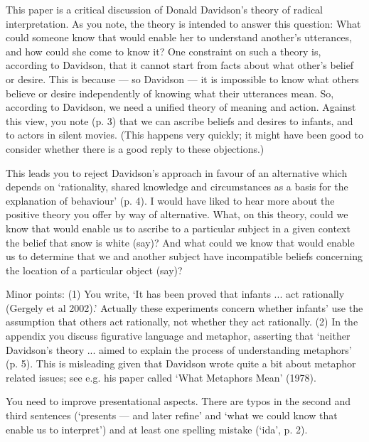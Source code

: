 \documentclass[12pt,a4paper]{extarticle}
\begin{document}
\setlength\footnotesep{1em}


\author{}
\date{}


\maketitle





This paper is a critical discussion of Donald Davidson's theory of radical interpretation.  As you note, the theory is intended to answer this question: What could someone know that would enable her to understand another's utterances, and how could she come to know it?  One constraint on such a theory is, according to Davidson, that it cannot start from facts about what other's belief or desire.  This is because --- so Davidson --- it is impossible to know what others believe or desire independently of knowing what their utterances mean.  So, according to Davidson, we need a unified theory of meaning and action.  Against this view, you note (p. 3) that we can ascribe beliefs and desires to infants, and to actors in silent movies.  (This happens very quickly; it might have been good to consider whether there is a good reply to these objections.)   

This leads you to reject Davidson's approach in favour of an alternative which depends on `rationality, shared knowledge and circumstances as a basis for the explanation of behaviour' (p. 4).  I would have liked to hear more about the positive theory you offer by way of alternative.  What, on this theory, could we know that would enable us to ascribe to a particular subject in a given context the belief that snow is white (say)?  And what could we know that would enable us to determine that we and another subject have incompatible beliefs concerning the location of a particular object (say)?

Minor points: (1) You write, `It has been proved that infants ... act rationally (Gergely et al 2002).'  Actually these experiments concern whether infants' use the assumption that others act rationally, not whether they act rationally.  (2) In the appendix you discuss figurative language and metaphor, asserting that `neither Davidson's theory ... aimed to explain the process of understanding metaphors' (p. 5).  This is misleading given that Davidson wrote quite a bit about metaphor related issues; see e.g. his paper called `What Metaphors Mean' (1978).

You need to improve presentational aspects.  There are typos in the second and third sentences (`presents --- and later refine' and `what we could know that enable us to interpret') and at least one spelling mistake (`ida', p. 2).  



\small

\end{document}
